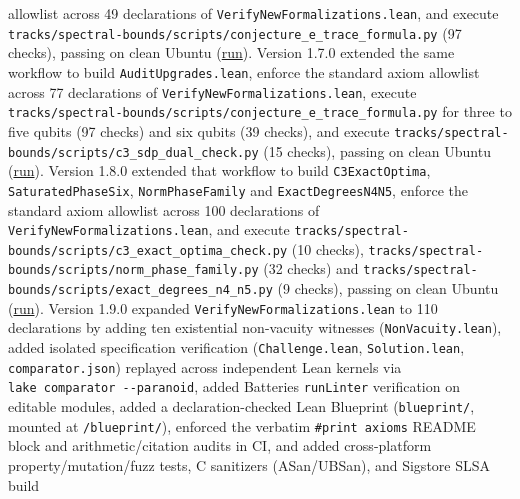 \documentclass[11pt,a4paper]{article}
\begin{document}
allowlist across 49 declarations of \nolinkurl{VerifyNewFormalizations.lean}, and execute
\nolinkurl{tracks/spectral-bounds/scripts/conjecture_e_trace_formula.py} (97 checks), passing on clean Ubuntu
(\href{https://github.com/0thernes/hoggar-bound-lab/actions/runs/44893871335}{run}). Version 1.7.0 extended the same workflow to build \nolinkurl{AuditUpgrades.lean}, enforce the standard axiom
allowlist across 77 declarations of \nolinkurl{VerifyNewFormalizations.lean}, execute \nolinkurl{tracks/spectral-bounds/scripts/conjecture_e_trace_formula.py}
for three to five qubits (97 checks) and six qubits (39 checks), and execute \nolinkurl{tracks/spectral-bounds/scripts/c3_sdp_dual_check.py}
(15 checks), passing on clean Ubuntu (\href{https://github.com/0thernes/hoggar-bound-lab/actions/runs/44908422882}{run}). Version 1.8.0 extended that workflow to build
\texttt{C3ExactOptima}, \texttt{SaturatedPhaseSix}, \texttt{NormPhaseFamily} and \texttt{ExactDegreesN4N5}, enforce the standard
axiom allowlist across 100 declarations of \nolinkurl{VerifyNewFormalizations.lean}, and execute
\nolinkurl{tracks/spectral-bounds/scripts/c3_exact_optima_check.py} (10 checks), \nolinkurl{tracks/spectral-bounds/scripts/norm_phase_family.py} (32 checks) and
\nolinkurl{tracks/spectral-bounds/scripts/exact_degrees_n4_n5.py} (9 checks), passing on clean Ubuntu
(\href{https://github.com/0thernes/hoggar-bound-lab/actions/runs/44959312365}{run}). Version 1.9.0 expanded \nolinkurl{VerifyNewFormalizations.lean} to
110 declarations by adding ten existential non-vacuity witnesses (\texttt{NonVacuity.lean}), added isolated
specification verification (\texttt{Challenge.lean}, \texttt{Solution.lean}, \texttt{comparator.json}) replayed across
independent Lean kernels via \texttt{lake\ comparator\ -\/-paranoid}, added Batteries \texttt{runLinter} verification on
editable modules, added a declaration-checked Lean Blueprint (\texttt{blueprint/}, mounted at \texttt{/blueprint/}),
enforced the verbatim \texttt{\#print\ axioms} README block and arithmetic/citation audits in CI, and added
cross-platform property/mutation/fuzz tests, C sanitizers (ASan/UBSan), and Sigstore SLSA build
\end{document}
